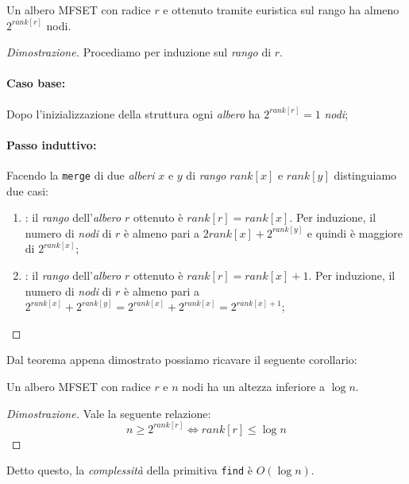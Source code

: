 \begin{definition}
    Un albero MFSET con radice $r$ e ottenuto tramite euristica sul rango ha
    almeno $2^{rank[r]}$ nodi.
\end{definition}
\begin{proof}[Dimostrazione]
    Procediamo per induzione sul \emph{rango} di $r$.

    \paragraph{Caso base: }
    Dopo l'inizializzazione della struttura ogni \emph{albero} ha $2^{rank[r]}=1$
    \emph{nodi};

    \paragraph{Passo induttivo: }
    Facendo la \texttt{merge} di due \emph{alberi} $x$ e $y$ di \emph{rango}
    $rank[x]$ e $rank[y]$ distinguiamo due casi:
    \begin{enumerate}
        \item {}: il \emph{rango} dell'\emph{albero} $r$
        ottenuto è $rank[r]=rank[x]$. Per induzione, il numero di \emph{nodi} di
        $r$ è almeno pari a $2{rank[x]}+2^{rank[y]}$ e quindi è maggiore di
        $2^{rank[x]}$;
        \item {}: il \emph{rango} dell'\emph{albero} $r$
        ottenuto è $rank[r]=rank[x]+1$. Per induzione, il numero di \emph{nodi}
        di $r$ è almeno pari a $2^{rank[x]}+2^{rank[y]}=2^{rank[x]}+2^{rank[x]}=
        2^{rank[x]+1}$;
    \end{enumerate}
\end{proof}

\noindent
Dal teorema appena dimostrato possiamo ricavare il seguente corollario:
\begin{definition}[Corollario]
    Un albero MFSET con radice $r$ e $n$ nodi ha un altezza inferiore a $\log n$.
\end{definition}
\begin{proof}[Dimostrazione]
    Vale la seguente relazione:
    \[n\geq 2^{rank[r]}\Leftrightarrow rank[r]\leq\log n\]
\end{proof}

\noindent
Detto questo, la \emph{complessità} della primitiva \texttt{find} è $O(\log n)$.

